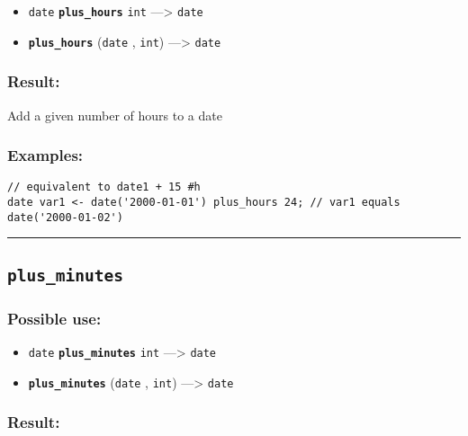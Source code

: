 \documentclass[]{book}
\providecommand{\tightlist}{%
  \setlength{\itemsep}{0pt}\setlength{\parskip}{0pt}}
\theoremstyle{definition}
\theoremstyle{definition}
\theoremstyle{definition}
\theoremstyle{remark}
\begin{document}
\begin{itemize}
\tightlist
\item
  \texttt{date} \textbf{\texttt{plus\_hours}} \texttt{int}
  ---\textgreater{} \texttt{date}
\item
  \textbf{\texttt{plus\_hours}} (\texttt{date} , \texttt{int})
  ---\textgreater{} \texttt{date}
\end{itemize}

\subsubsection{Result:}\label{result-388}

Add a given number of hours to a date

\subsubsection{Examples:}\label{examples-277}

\begin{verbatim}
// equivalent to date1 + 15 #h  
date var1 <- date('2000-01-01') plus_hours 24; // var1 equals date('2000-01-02')
\end{verbatim}

\begin{center}\rule{0.5\linewidth}{\linethickness}\end{center}

\subsection{\texorpdfstring{\texttt{plus\_minutes}}{plus\_minutes}}\label{plus_minutes}

\subsubsection{Possible use:}\label{possible-use-403}

\begin{itemize}
\tightlist
\item
  \texttt{date} \textbf{\texttt{plus\_minutes}} \texttt{int}
  ---\textgreater{} \texttt{date}
\item
  \textbf{\texttt{plus\_minutes}} (\texttt{date} , \texttt{int})
  ---\textgreater{} \texttt{date}
\end{itemize}

\subsubsection{Result:}\label{result-389}
\end{document}
